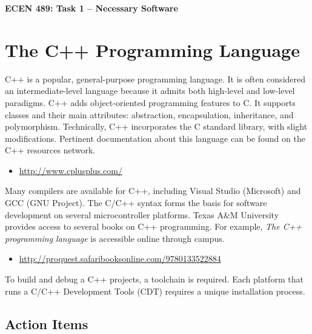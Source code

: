 \documentclass[11pt]{article}
\begin{document}
\begin{center}
{\bfseries \LARGE ECEN 489: Task 1 -- Necessary Software\\[8mm]}
\end{center}


\section{The C++ Programming Language}

C++ is a popular, general-purpose programming language.
It is often considered an intermediate-level language because it admits both high-level and low-level paradigms.
C++ adds object-oriented programming features to C.
It supports classes and their main attributes: abstraction, encapsulation, inheritance, and polymorphism.
Technically, C++ incorporates the C standard library, with slight modifications.
Pertinent documentation about this language can be found on the C++ resources network.
\begin{itemize}
\item \url{http://www.cplusplus.com/}
\end{itemize}
Many compilers are available for C++, including Visual Studio (Microsoft) and GCC (GNU Project).
The C/C++ syntax forms the basis for software development on several microcontroller platforms.
Texas A\&M University provides access to several books on C++ programming.
For example, \emph{The C++ programming language} is accessible online through campus.
\begin{itemize}
\item \url{http://proquest.safaribooksonline.com/9780133522884}
\end{itemize}
To build and debug a C++ projects, a toolchain is required.
Each platform that runs a C/C++ Development Tools (CDT) requires a unique installation process.


\subsection*{Action Items}
\end{document}

